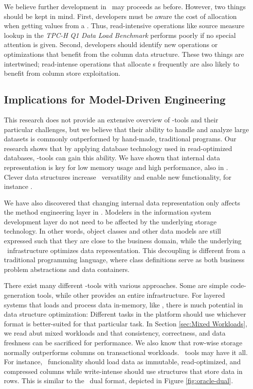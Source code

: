 We believe further development in \gap~may proceeds as before. However, two things should be kept in mind. First, developers must be aware the cost of  allocation when getting values from a . Thus, read-intensive operations like source measure lookup in the \textit{TPC-H Q1 Data Load Benchmark} performs poorly if no special attention is given. Second, developers should identify new operations or optimizations that benefit from the column data structure. These two things are intertwined; read-intense operations that allocate s frequently are also likely to benefit from column store exploitation.

\subsection{Implications for Model-Driven Engineering}
\label{sub:Implications for Model-Driven Engineering}
This research does not provide an extensive overview of \mdd-tools and their particular challenges, but we believe that their ability to handle and analyze large datasets is commonly outperformed by hand-made, traditional programs. Our research shows that by applying database technology used in read-optimized databases, \mde-tools can gain this ability. We have shown that internal data representation is key for low memory usage and high performance, also in \mdd. Clever data structures increase \mde~versatility and enable new functionality, for instance \bd.

We have also discovered that changing internal data representation only affects the method engineering layer in \mde. Modelers in the information system development layer do not need to be affected by the underlying storage technology. In other words, object classes and other data models are still expressed such that they are close to the business domain, while the underlying \mde~infrastructure optimizes data representation. This decoupling is different from a traditional programming language, where class definitions serve as both business problem abstractions and data containers.

There exist many different \mdd-tools with various approaches. Some are simple code-generation tools, while other provides an entire infrastructure. For layered systems that loads and process data in-memory, like \gap, there is much potential in data structure optimization: Different tasks in the platform should use whichever format is better-suited for that particular task. In Section \ref{sec:Mixed Workloads}, we read abut mixed workloads and that consistency, correctness, and data freshness can be sacrificed for performance. We also know that row-wise storage normally outperforms columns on transactional workloads. \mde~tools may have it all. For instance, \bd~funcionality should load data as immutable, read-optimized, and compressed columns while write-intense should use structures that store data in rows. This is similar to the \oracle~dual format, depicted in Figure \ref{fig:oracle-dual}.

